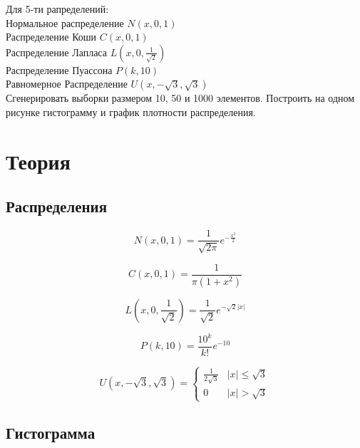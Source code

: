 \documentclass[a4]{article}
\begin{document}
	Для 5-ти рапределений:\\
		Нормальное распределение $N(x,0,1)$\\
		Распределение Коши $C(x,0,1)$\\
		Распределение Лапласа $L( x,0,\frac{1}{\sqrt{2}})$\\
		Распределение Пуассона $P(k, 10)$\\
		Равномерное Распределение $U(x,-\sqrt{3}, \sqrt{3})$\\
		
		Сгенерировать выборки размером 10, 50 и 1000 элементов.
		Построить на одном рисунке гистограмму и график плотности распределения.
		
	
	\section{Теория}
		\subsection{Распределения}
		
			\begin{equation}\label{eqn:normal}
			N(x,0,1) = \frac{1}{\sqrt{2\pi}}e^{-\frac{x^2}{2}}
			\end{equation} 
			
			\begin{equation}\label{eqn:cauchy}
			C(x,0,1) = \frac{1}{\pi(1+x^2)}
			\end{equation}
			
			\begin{equation}\label{eqn:laplace}
			L\left( x,0,\frac{1}{\sqrt{2}}\right) = \frac{1}{\sqrt{2}}e^{-\sqrt{2}\vert x\vert}
			\end{equation}
			
			\begin{equation}\label{eqn:poisson}
			P(k,10) = \frac{10^k}{k!}e^{-10}
			\end{equation}  
			
			\begin{equation}\label{eqn:uniform}
			U(x,-\sqrt{3}, \sqrt{3}) = 
			\begin{cases}
			\frac{1}{2\sqrt{3}} &\vert x\vert \leqslant \sqrt{3}\\
			0 &\vert x\vert > \sqrt{3}
			\end{cases}
			\end{equation}
		
		
		\subsection{Гистограмма}
\end{document}
